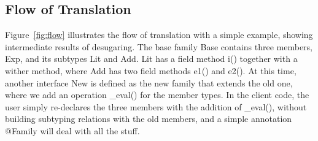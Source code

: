 
\subsection{Flow of Translation}
Figure~\ref{fig:flow} illustrates the flow of translation with a simple example, showing intermediate results of desugaring. The base family \textsf{Base} contains three members, \textsf{Exp}, and its subtypes \textsf{Lit} and \textsf{Add}. \textsf{Lit} has a field method \textsf{i()} together with a wither method, where \textsf{Add} has two field methods \textsf{e1()} and \textsf{e2()}. At this time, another interface \textsf{New} is defined as the new family that extends the old one, where we add an operation \textsf{\_eval()} for the member types. In the client code, the user simply re-declares the three members with the addition of \textsf{\_eval()}, without building subtyping relations with the old members, and a simple annotation \textsf{@Family} will deal with all the stuff.

